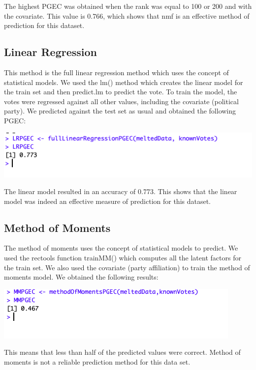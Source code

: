 \documentclass{article}
\begin{document}
The highest PGEC was obtained when the rank was equal to 100 or 200 and with the covariate. This value is 0.766, which shows that nmf is an effective method of prediction for this dataset.


\subsection{Linear Regression}


This method is the full linear regression method which uses the concept of statistical models. We used the lm() method which creates the linear model for the train set and then predict.lm to predict the vote. To train the model, the votes were regressed against all other values, including the covariate (political party). We predicted against the test set as usual and obtained the following PGEC:

\includegraphics[scale = 0.7]{LMoutput.png}

The linear model resulted in an accuracy of 0.773. This shows that the linear model was indeed an effective measure of prediction for this dataset.

\subsection{Method of Moments}



The method of moments uses the concept of statistical models to predict. We used the rectools function trainMM() which computes all the latent factors for the train set. We also used the covariate (party affiliation) to train the method of moments model. We obtained the following results:

\includegraphics[scale = 0.7]{MMoutput.png}

This means that less than half of the predicted values were correct. Method of moments is not a reliable prediction method for this data set.
\end{document}
